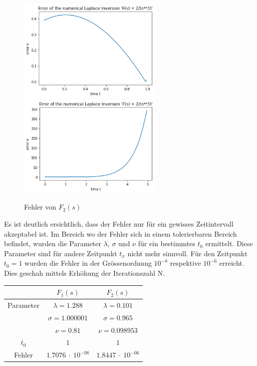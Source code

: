 
\begin{figure}
\centering
\includegraphics[width=6.9cm]{papers/laplace/Error_2divide_s_pow3}
\includegraphics[width=6.9cm]{papers/laplace/Error_2divide_s_pow3_bis_tgleich5}
\caption{Fehler von $F_{2}(s)$
\label{laplace:fehlerf2}
}
\end{figure}



Es ist deutlich ersichtlich, dass der Fehler nur für ein gewisses
Zeitintervall akzeptabel ist. Im Bereich wo der Fehler sich in einem
tolerierbaren Bereich befindet, wurden die Parameter $\lambda$,
$\sigma$ und $\nu$ für ein bestimmtes $t_{0}$ ermittelt.
Diese Parameter sind für andere Zeitpunkt $t_{x}$ nicht mehr sinnvoll. 
Für den Zeitpunkt $t_{0}=1$ wurden die Fehler in der Grössenordnung $10^{-8}$ respektive $10^{-6}$ erreicht. 
Dies geschah mittels Erhöhung der Iterationszahl N.

\begin{center}
\begin{tabular}[c]{c|c|c}
& $F_{1}(s)$ & $F_{2}(s)$ \\
\hline
Parameter & $\lambda=1.288$ & $\lambda=0.101$ \\
 & $\sigma=1.000001$ & $\sigma=0.965$ \\
 & $\nu=0.81$ & $\nu=0.098953$ \\
\hline
$t_{0}$ & $1$ & $1$ \\
\hline
Fehler & $1.7076~\cdot~10^{-08}$ & $1.8447~\cdot~10^{-06}$ \\
\end{tabular}
\end{center}


